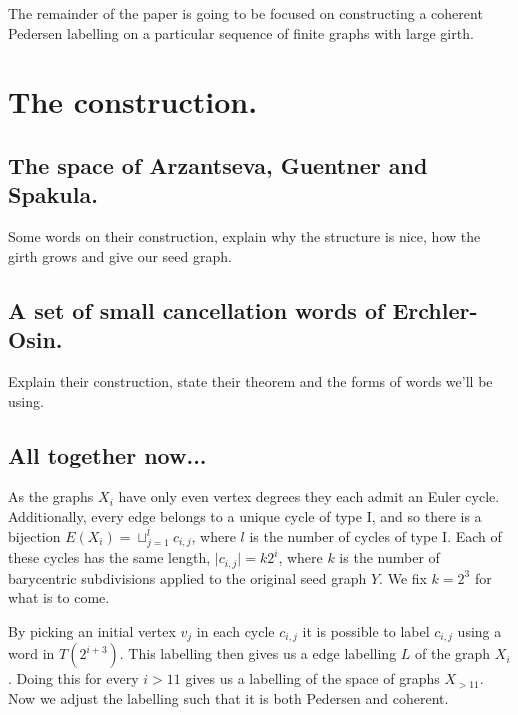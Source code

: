 \documentclass[11pt,a4paper]{amsart}
\theoremstyle{plain}
\theoremstyle{definition}%
\theoremstyle{remark}%
\begin{document}
The remainder of the paper is going to be focused on constructing a coherent Pedersen labelling on a particular sequence of finite graphs with large girth.

\section{The construction.}

\subsection{The space of Arzantseva, Guentner and Spakula.}

Some words on their construction, explain why the structure is nice, how the girth grows and give our seed graph.

\subsection{A set of small cancellation words of Erchler-Osin.}

Explain their construction, state their theorem and the forms of words we'll be using.

\subsection{All together now...}

As the graphs $X_{i}$ have only even vertex degrees they each admit an Euler cycle. Additionally, every edge belongs to a unique cycle of type I, and so there is a bijection $E(X_{i}) = \sqcup_{j=1}^{l} c_{i,j}$, where $l$ is the number of cycles of type I. Each of these cycles has the same length, $\vert c_{i,j} \vert = k2^{i}$, where $k$ is the number of barycentric subdivisions applied to the original seed graph $Y$. We fix $k=2^{3}$ for what is to come.

By picking an initial vertex $v_{j}$ in each cycle $c_{i,j}$ it is possible to label $c_{i,j}$ using a word in $T(2^{i+3})$. This labelling then gives us a edge labelling $L$ of the graph $X_{i}$. Doing this for every $i>11$ gives us a labelling of the space of graphs $X_{>11}$. Now we adjust the labelling such that it is both Pedersen and coherent.
\end{document}
